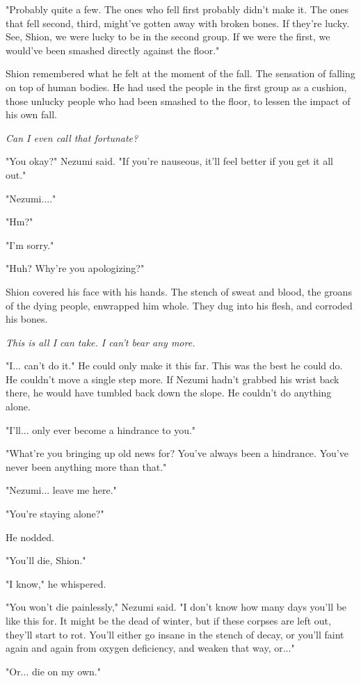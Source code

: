 "Probably quite a few. The ones who fell first probably didn't make it.
The ones that fell second, third, might've gotten away with broken
bones. If they're lucky. See, Shion, we were lucky to be in the second
group. If we were the first, we would've been smashed directly against
the floor."

Shion remembered what he felt at the moment of the fall. The sensation
of falling on top of human bodies. He had used the people in the first
group as a cushion, those unlucky people who had been smashed to the
floor, to lessen the impact of his own fall.

\emph{Can I even call that fortunate?}

"You okay?" Nezumi said. "If you're nauseous, it'll feel better if you
get it all out."

"Nezumi...."

"Hm?"

"I'm sorry."

"Huh? Why're you apologizing?"

Shion covered his face with his hands. The stench of sweat and blood,
the groans of the dying people, enwrapped him whole. They dug into his
flesh, and corroded his bones.

\emph{This is all I can take. I can't bear any more.}

"I... can't do it." He could only make it this far. This was the best he
could do. He couldn't move a single step more. If Nezumi hadn't grabbed
his wrist back there, he would have tumbled back down the slope. He
couldn't do anything alone.

"I'll... only ever become a hindrance to you."

"What're you bringing up old news for? You've always been a hindrance.
You've never been anything more than that."

"Nezumi... leave me here."

"You're staying alone?"

He nodded.

"You'll die, Shion."

"I know," he whispered.

"You won't die painlessly," Nezumi said. "I don't know how many days
you'll be like this for. It might be the dead of winter, but if these
corpses are left out, they'll start to rot. You'll either go insane in
the stench of decay, or you'll faint again and again from oxygen
deficiency, and weaken that way, or..."

"Or... die on my own."

